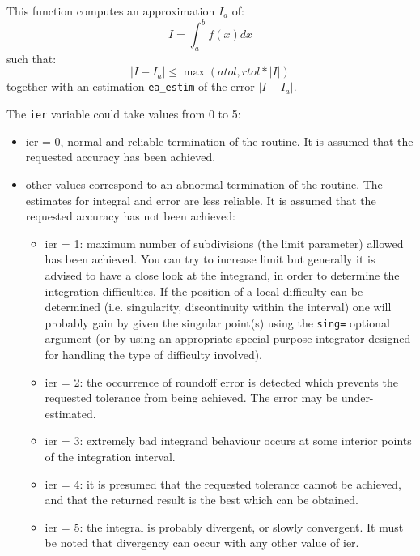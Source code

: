 \begin{mandescription}
This function computes an approximation $I_a$ of:
$$
   I = \int_a^b f(x) dx
$$
such that:
$$
   | I - I_a | \le  \max (atol, rtol*|I|)
$$
together with an estimation \verb+ea_estim+ of the error  $| I - I_a |$.

The \verb+ier+ variable could take values from 0 to 5: 
\begin{itemize}
\item ier = 0,  normal and reliable termination of the routine. It is assumed that the
      requested  accuracy has been achieved.
\item other values correspond to an abnormal termination of the routine. The estimates
      for integral and error are less reliable. It is assumed that the  requested accuracy
      has not been achieved:
      \begin{itemize}
      \item ier = 1: maximum number of subdivisions (the limit
            parameter) allowed has been achieved. You can try to
            increase limit but generally it is advised to have a close look at the
            integrand, in order to determine the integration
            difficulties. If the position of a local difficulty can
            be determined (i.e.  singularity, discontinuity within
            the interval) one will probably gain by given the singular
            point(s) using the \verb+sing=+ optional argument (or
            by using an appropriate special-purpose integrator 
            designed for handling the type  of difficulty involved).
      \item ier = 2: the occurrence of roundoff error is detected
            which prevents the requested tolerance from being
            achieved. The error may be under-estimated.
      \item ier = 3: extremely bad integrand behaviour occurs at 
            some interior points of the integration interval.
      \item ier = 4: it is presumed that the requested tolerance 
            cannot be achieved, and that the returned result is the
            best which can be obtained.
      \item ier = 5: the integral is probably divergent, or slowly
            convergent. It must be noted that divergency can occur with
            any other value of ier.
      \end{itemize}
\end{itemize}


\end{mandescription}
